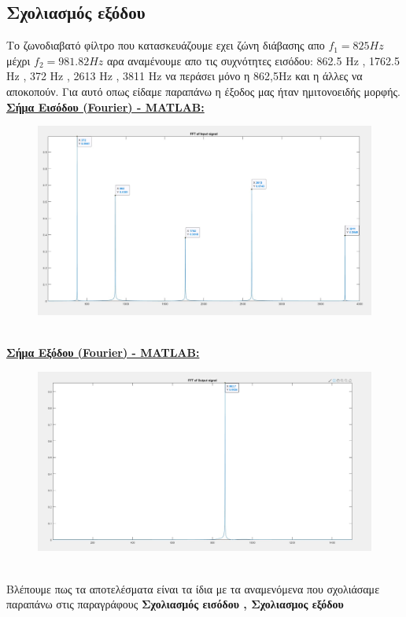 \documentclass{article}
\begin{document}
{\subsection*{Σχολιασμός εξόδου}
Το ζωνοδιαβατό φίλτρο που κατασκευάζουμε εχει ζώνη διάβασης απο $f_1 = 825Hz$ μέχρι $f_2 = 981.82Hz$ αρα αναμένουμε απο τις συχνότητες εισόδου:  862.5 Hz , 1762.5 Hz , 372 Hz , 2613 Hz , 3811 Hz να περάσει μόνο η 862,5Hz και η άλλες να αποκοπούν. Για αυτό οπως είδαμε παραπάνω η έξοδος μας ήταν ημιτονοειδής μορφής.
\clearpage
\textbf{\underline{Σήμα Εισόδου (Fourier) - MATLAB:}}
\begin{figure}[h!]
\centering
 	\advance\leftskip-0.5cm
  \includegraphics[width=130mm,scale=2]{thema2/fmatin.jpg}
\end{figure} \\[1.4\baselineskip]
\textbf{\underline{Σήμα Εξόδου (Fourier) - MATLAB:}}
\begin{figure}[h!]
\centering
 	\advance\leftskip-0.5cm
  \includegraphics[width=130mm,scale=2]{thema2/fmatout.jpg}
\end{figure} \\
Βλέπουμε πως τα αποτελέσματα είναι τα ίδια με τα αναμενόμενα που σχολιάσαμε παραπάνω στις παραγράφους\textbf{ Σχολιασμός εισόδου , Σχολιασμος εξόδου}
}
\end{document}
